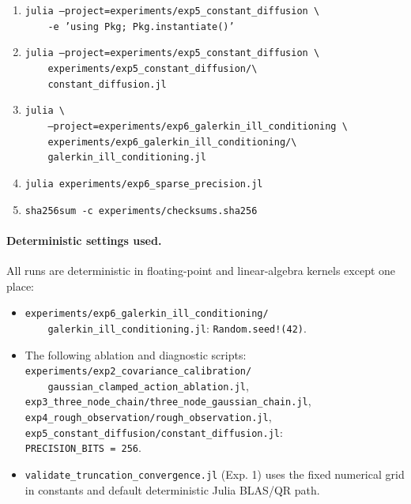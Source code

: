 \begin{enumerate}
          \texttt{\ \ \ \ experiments/exp4\_rough\_observation/\textbackslash} \\
          \texttt{\ \ \ \ rough\_observation.jl}
    \item \texttt{julia --project=experiments/exp5\_constant\_diffusion \textbackslash} \\
          \texttt{\ \ \ \ -e 'using Pkg; Pkg.instantiate()'}
    \item \texttt{julia --project=experiments/exp5\_constant\_diffusion \textbackslash} \\
          \texttt{\ \ \ \ experiments/exp5\_constant\_diffusion/\textbackslash} \\
          \texttt{\ \ \ \ constant\_diffusion.jl}
    \item \texttt{julia \textbackslash} \\
          \texttt{\ \ \ \ --project=experiments/exp6\_galerkin\_ill\_conditioning \textbackslash} \\
          \texttt{\ \ \ \ experiments/exp6\_galerkin\_ill\_conditioning/\textbackslash} \\
          \texttt{\ \ \ \ galerkin\_ill\_conditioning.jl}
    \item \texttt{julia experiments/exp6\_sparse\_precision.jl}
    \item \texttt{sha256sum -c experiments/checksums.sha256}
\end{enumerate}

\paragraph{Deterministic settings used.}
All runs are deterministic in floating-point and linear-algebra kernels except
one place:
\begin{itemize}
    \item \texttt{experiments/exp6\_galerkin\_ill\_conditioning/} \\
          \texttt{\ \ \ \ galerkin\_ill\_conditioning.jl}:
          \texttt{Random.seed!(42)}.
    \item The following ablation and diagnostic scripts: \\
          \texttt{experiments/exp2\_covariance\_calibration/} \\
          \texttt{\ \ \ \ gaussian\_clamped\_action\_ablation.jl}, \\
          \texttt{exp3\_three\_node\_chain/}\allowbreak\texttt{three\_node\_gaussian\_chain.jl}, \\
          \texttt{exp4\_rough\_observation/}\allowbreak\texttt{rough\_observation.jl}, \\
          \texttt{exp5\_constant\_diffusion/}\allowbreak\texttt{constant\_diffusion.jl}: \\
          \texttt{PRECISION\_BITS = 256}.
    \item \texttt{validate\_truncation\_convergence.jl} (Exp. 1) uses the
    fixed numerical grid in constants and default deterministic Julia BLAS/QR path.
\end{itemize}

